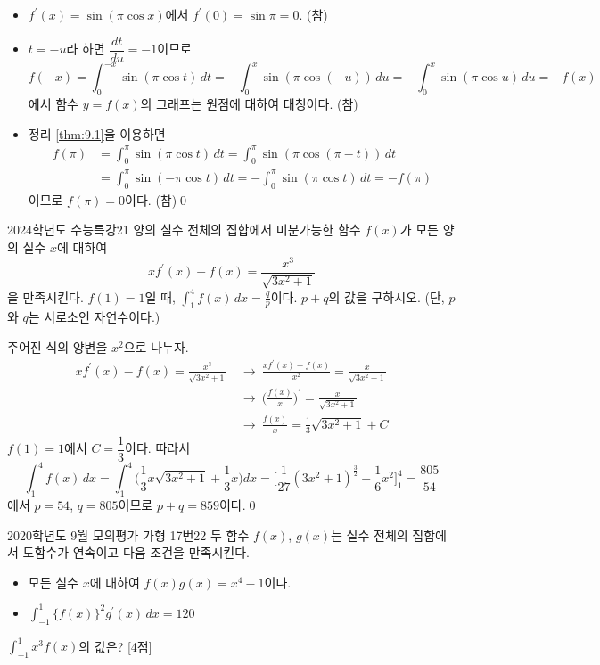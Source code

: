 \documentclass{article}
\begin{document}
\begin{sol}
	\begin{itemize}
		\item[ㄱ.] $f^{\prime}(x)=\sin(\pi\cos x)$에서 $f^{\prime}(0)=\sin\pi=0$. (참)
		\item[ㄴ.] $t=-u$라 하면 $\dfrac{dt}{du}=-1$이므로
			\[
				f(-x)=\int_0^{-x}\sin(\pi\cos t)\,dt=-\int_0^x\sin(\pi\cos(-u))\,du=-\int_0^x\sin(\pi\cos u)\,du=-f(x)
			\]
			에서 함수 $y=f(x)$의 그래프는 원점에 대하여 대칭이다. (참)
		\item[ㄷ.] 정리 \ref{thm:9.1}을 이용하면
			\begin{align*}
				f(\pi)&=\int_0^\pi\sin(\pi\cos t)\,dt=\int_0^\pi\sin(\pi\cos(\pi-t))\,dt\\[3pt]
				&=\int_0^\pi\sin(-\pi\cos t)\,dt=-\int_0^\pi\sin(\pi\cos t)\,dt=-f(\pi)
			\end{align*}
			이므로 $f(\pi)=0$이다. (참)\qed
	\end{itemize}
\end{sol}

\newpage
\begin{prob}{2024학년도 수능특강}{21}
	양의 실수 전체의 집합에서 미분가능한 함수 $f(x)$가 모든 양의 실수 $x$에 대하여
	\[
		xf^{\prime}(x)-f(x)=\frac{x^3}{\sqrt{3x^2+1}}
	\]
	을 만족시킨다. $f(1)=1$일 때, $\displaystyle\int_1^4f(x)\,dx=\frac{q}{p}$이다. $p+q$의 값을 구하시오. (단, $p$와 $q$는 서로소인 자연수이다.)
\end{prob}

\begin{sol}
	주어진 식의 양변을 $x^2$으로 나누자.
	\begin{align*}
		xf^{\prime}(x)-f(x)=\frac{x^3}{\sqrt{3x^2+1}}~&\longrightarrow~\frac{xf^{\prime}(x)-f(x)}{x^2}=\frac{x}{\sqrt{3x^2+1}}\\[3pt]
		&\longrightarrow~\biggl(\frac{f(x)}{x}\biggr)^{\prime}=\frac{x}{\sqrt{3x^2+1}}\\[3pt]
		&\longrightarrow~\frac{f(x)}{x}=\frac{1}{3}\sqrt{3x^2+1}+C
	\end{align*}
	$f(1)=1$에서 $C=\dfrac{1}{3}$이다. 따라서
	\[
		\int_1^4f(x)\,dx=\int_1^4\biggl(\frac{1}{3}x\sqrt{3x^2+1}+\frac{1}{3}x\biggr)dx=\biggl[\frac{1}{27}(3x^2+1)^{\frac{3}{2}}+\frac{1}{6}x^2\biggr]_1^4=\frac{805}{54}
	\]
	에서 $p=54$, $q=805$이므로 $p+q=859$이다.\qed
\end{sol}

\newpage
\begin{prob}{2020학년도 9월 모의평가 가형 17번}{22}
	두 함수 $f(x)$, $g(x)$는 실수 전체의 집합에서 도함수가 연속이고 다음 조건을 만족시킨다.
	\begin{hint}
		\begin{itemize}
			\item[(가)] 모든 실수 $x$에 대하여 $f(x)g(x)=x^4-1$이다.
			\item[(나)] $\displaystyle\int_{-1}^1\{f(x)\}^2g^{\prime}(x)\,dx=120$
		\end{itemize}
	\end{hint}
	$\displaystyle\int_{-1}^1x^3f(x)$의 값은? [4점]
\end{prob}
\end{document}
